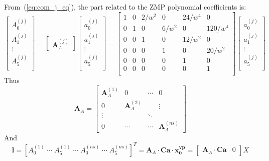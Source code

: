 \documentclass[journal]{IEEEtran}
\begin{document}
From~(\ref{eq:com_j_eq}), the part related to the ZMP polynomial coefficients is:
\begin{equation}
\begin{bmatrix}
A_0^{(j)} \\
A_1^{(j)} \\
\vdots \\
A_5^{(j)} \\
\end{bmatrix}
=
\begin{bmatrix}
\textbf{A}^{(j)}_{A}
\end{bmatrix}
\begin{bmatrix}
a_0^{(j)} \\
a_1^{(j)} \\
\vdots \\
a_5^{(j)} \\
\end{bmatrix}
=
\begin{bmatrix}
1 & 0 & 2/w^2 & 0 & 24/w^4 & 0 \\
0 & 1 & 0 & 6/w^2 & 0 & 120/w^4 \\
0 & 0 & 1 & 0 & 12/w^2 & 0 \\
0 & 0 & 0 & 1 & 0 & 20/w^2 \\
0 & 0 & 0 & 0 & 1 & 0 \\
0 & 0 & 0 & 0 & 0 & 1 \\
\end{bmatrix}
\begin{bmatrix}
a_0^{(j)} \\
a_1^{(j)} \\
\vdots \\
a_5^{(j)} \\
\end{bmatrix}
\end{equation}
Thus
\begin{equation}
\textbf{A}_A=
\begin{bmatrix}
\textbf{A}^{(1)}_{A} & 0 & \cdots & 0\\
0 & \textbf{A}^{(2)}_{A} & {} & \vdots\\
\vdots & {} & \ddots \\
0 & \cdots & \cdots & \textbf{A}^{(ns)}_{A}
\end{bmatrix}
\end{equation}
And
\begin{equation}
\label{eq:l}
\textbf{l}=\left[ A_{0}^{(1)} \; \cdots \; A_{5}^{(1)} \; \cdots \; A_{0}^{(ns)} \; \cdots \; A_{5}^{(ns)}\right]^{T}=\mathbf{A}_A\cdot\mathbf{Ca}\cdot\mathbf{x^{vp}_0}=\begin{bmatrix} \mathbf{A}_A\cdot\mathbf{Ca} & 0 \end{bmatrix} X
\end{equation}
\end{document}
